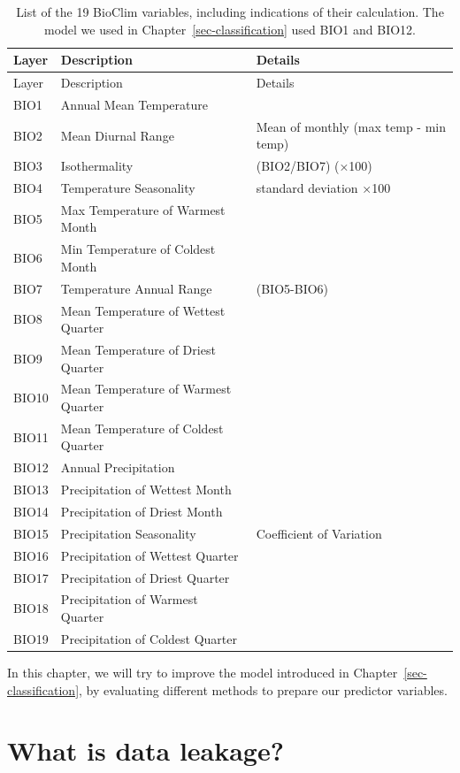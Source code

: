 \documentclass[
  letterpaper,
]{scrbook}
\begin{document}
\begin{longtable}[]{@{}lll@{}}
\caption{List of the 19 BioClim variables, including indications of
their calculation. The model we used in Chapter~\ref{sec-classification}
used BIO1 and BIO12.}\label{tbl-predictors-bioclim}\tabularnewline
\toprule\noalign{}
Layer & Description & Details \\
\midrule\noalign{}
\endfirsthead
\toprule\noalign{}
Layer & Description & Details \\
\midrule\noalign{}
\endhead
\bottomrule\noalign{}
\endlastfoot
BIO1 & Annual Mean Temperature & \\
BIO2 & Mean Diurnal Range & Mean of monthly (max temp - min temp) \\
BIO3 & Isothermality & (BIO2/BIO7) (×100) \\
BIO4 & Temperature Seasonality & standard deviation ×100 \\
BIO5 & Max Temperature of Warmest Month & \\
BIO6 & Min Temperature of Coldest Month & \\
BIO7 & Temperature Annual Range & (BIO5-BIO6) \\
BIO8 & Mean Temperature of Wettest Quarter & \\
BIO9 & Mean Temperature of Driest Quarter & \\
BIO10 & Mean Temperature of Warmest Quarter & \\
BIO11 & Mean Temperature of Coldest Quarter & \\
BIO12 & Annual Precipitation & \\
BIO13 & Precipitation of Wettest Month & \\
BIO14 & Precipitation of Driest Month & \\
BIO15 & Precipitation Seasonality & Coefficient of Variation \\
BIO16 & Precipitation of Wettest Quarter & \\
BIO17 & Precipitation of Driest Quarter & \\
BIO18 & Precipitation of Warmest Quarter & \\
BIO19 & Precipitation of Coldest Quarter & \\
\end{longtable}

In this chapter, we will try to improve the model introduced in
Chapter~\ref{sec-classification}, by evaluating different methods to
prepare our predictor variables.

\section{What is data leakage?}\label{sec-leakage}
\end{document}
